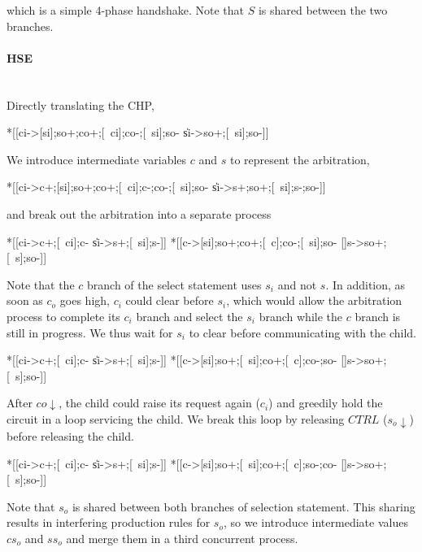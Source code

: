 \documentclass[aer.tex]{subfiles}
\begin{document}
\noindent which is a simple 4-phase handshake. Note that $S$ is shared between the two branches.

\paragraph{HSE}\mbox{}\\

\noindent Directly translating the CHP,

\begin{hse}
*[[ci->[si];so+;co+;[~ci];co-;[~si];so-
  \|si->so+;[~si];so-]]
\end{hse}

\noindent We introduce intermediate variables $c$ and $s$ to represent the arbitration,

\begin{hse}
*[[ci->c+;[si];so+;co+;[~ci];c-;co-;[~si];so-
  \|si->s+;so+;[~si];s-;so-]]
\end{hse}

\noindent and break out the arbitration into a separate process

\begin{hse}
*[[ci->c+;[~ci];c-
  \|si->s+;[~si];s-]]
*[[c->[si];so+;co+;[~c];co-;[~si];so-
  []s->so+;[~s];so-]]
\end{hse}

\noindent Note that the $c$ branch of the select statement uses $s_i$ and not $s$. In addition, as soon as $c_o$ goes high, $c_i$ could clear before $s_i$, which would allow the arbitration process to complete its $c_i$ branch and select the $s_i$ branch while the $c$ branch is still in progress. We thus wait for $s_i$ to clear before communicating with the child.

\begin{hse}
*[[ci->c+;[~ci];c-
  \|si->s+;[~si];s-]]
*[[c->[si];so+;[~si];co+;[~c];co-;so-
  []s->so+;[~s];so-]]
\end{hse}

\noindent After $co\!\downarrow$, the child could raise its request again ($c_i$) and greedily hold the circuit in a loop servicing the child. We break this loop by releasing $CTRL$ ($s_o\!\downarrow$) before releasing the child.

\begin{hse}
*[[ci->c+;[~ci];c-
  \|si->s+;[~si];s-]]
*[[c->[si];so+;[~si];co+;[~c];so-;co-
  []s->so+;[~s];so-]]
\end{hse}

\noindent Note that $s_o$ is shared between both branches of selection statement. This sharing results in interfering production rules for $s_o$, so we introduce intermediate values $cs_o$ and $ss_o$ and merge them in a third concurrent process.
\end{document}
